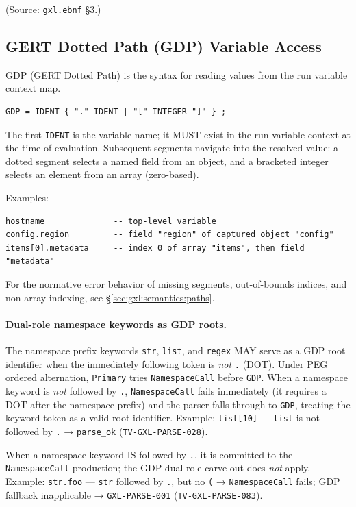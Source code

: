 (Source: \texttt{gxl.ebnf} \S3.)

\subsection{GERT Dotted Path (GDP) Variable Access}
\label{subsec:gxl:gdp}

GDP (GERT Dotted Path) is the syntax for reading values from the run
variable context map.

\begin{verbatim}
GDP = IDENT { "." IDENT | "[" INTEGER "]" } ;
\end{verbatim}

The first \texttt{IDENT} is the variable name; it MUST exist in the run
variable context at the time of evaluation.
Subsequent segments navigate into the resolved value:
a dotted segment selects a named field from an object,
and a bracketed integer selects an element from an array (zero-based).

\noindent Examples:

\begin{verbatim}
hostname              -- top-level variable
config.region         -- field "region" of captured object "config"
items[0].metadata     -- index 0 of array "items", then field "metadata"
\end{verbatim}

For the normative error behavior of missing segments, out-of-bounds indices,
and non-array indexing, see \S\ref{sec:gxl:semantics:paths}.

\paragraph{Dual-role namespace keywords as GDP roots.}
The namespace prefix keywords \texttt{str}, \texttt{list}, and \texttt{regex}
MAY serve as a GDP root identifier when the immediately following token is
\emph{not} \texttt{.} (DOT).
Under PEG ordered alternation, \texttt{Primary} tries \texttt{NamespaceCall}
before \texttt{GDP}.
When a namespace keyword is \emph{not} followed by \texttt{.},
\texttt{NamespaceCall} fails immediately (it requires a DOT after the
namespace prefix) and the parser falls through to \texttt{GDP}, treating the
keyword token as a valid root identifier.
Example: \texttt{list[10]} — \texttt{list} is not followed by \texttt{.}
→ \texttt{parse\_ok} (\texttt{TV-GXL-PARSE-028}).

When a namespace keyword IS followed by \texttt{.}, it is committed to the
\texttt{NamespaceCall} production; the GDP dual-role carve-out does
\emph{not} apply.
Example: \texttt{str.foo} — \texttt{str} followed by \texttt{.}, but no
\texttt{(} → \texttt{NamespaceCall} fails; GDP fallback inapplicable →
\texttt{GXL-PARSE-001} (\texttt{TV-GXL-PARSE-083}).

